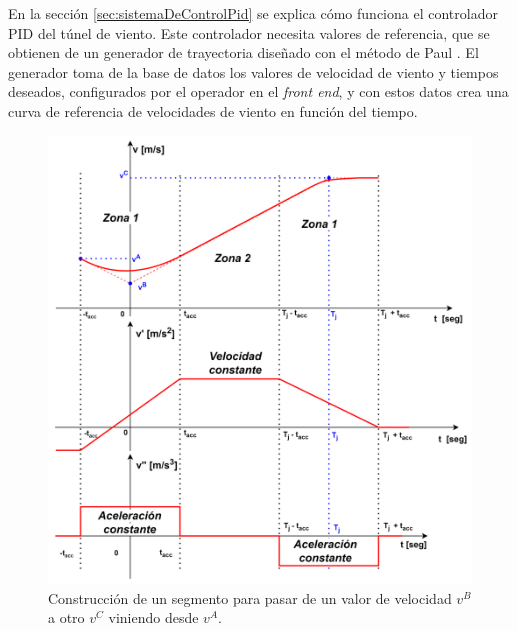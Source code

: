 En la sección \ref{sec:sistemaDeControlPid} se explica cómo funciona el controlador PID del túnel de viento. Este controlador necesita valores de referencia, que se obtienen de un generador de trayectoria diseñado con el método de Paul \cite{RoboFIUBAGenTrayec}. El generador toma de la base de datos los valores de velocidad de viento y tiempos deseados, configurados por el operador en el \textit{front end}, y con estos datos crea una curva de referencia de velocidades de viento en función del tiempo.

\begin{figure}[H]
    \centering
    \includegraphics[width=0.85\linewidth]{Figuras/AplicacionWeb/backend/segmentoTrayect.png}
    \caption{Construcción de un segmento para pasar de un valor de velocidad $v^B$ a otro $v^C$ viniendo desde $v^A$.}
    \label{fig:segmentosZona1yZona2}
\end{figure}

